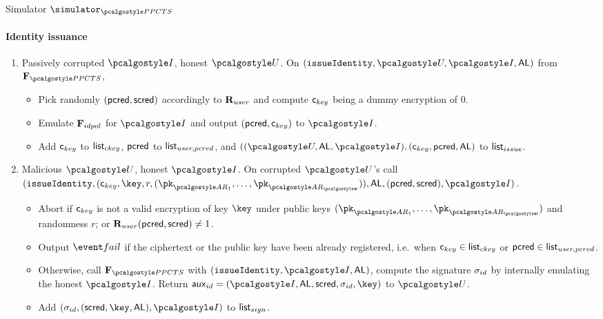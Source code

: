 \documentclass[runningheads,10pt]{llncs}
\numberwithin{equation}{section}
\begin{document}
\begin{simbox}{Simulator $\simulator_{\PPCTS}$}
  \paragraph{Identity issuance}
  \begin{enumerate}
  \item Passively corrupted $\idprov$, honest $\user$. On $(\issueIdentity, \user, \idprov, \AL)$ from $\func{\PPCTS}$,
    \begin{itemize}
    \item Pick
      randomly $(\mathsf{pcred}, \mathsf{scred})$ accordingly to $\mathbf{R}_{user}$ and compute $\mathsf{c}_{key}$ being a
      dummy encryption of $0$.
  \item Emulate $\mathbf{F}_{{idpol}}$ for $\idprov$ and output $(\mathsf{pcred}, \mathsf{c}_{key})$
    to $\idprov$. 
  \item Add $\mathsf{c}_{key}$ to ${\mathsf{list}_{ckey}}$, $\mathsf{pcred}$ to ${\mathsf{list}_{user, pcred}}$, and
    $((\user, \AL, \idprov), (\ckey, \pcred, \AL)$ to ${\mathsf{list}_{issue}}$.
  \end{itemize}
\item Malicious $\user$, honest $\idprov$. On corrupted $\user$'s call $(\issueIdentity, (\ckey, \key, r,
      (\pk_{\ar_1}, \ldots, \pk_{\ar_\noofar})), \AL, (\pcred, \scred),
      \idprov)$.
  \begin{itemize}
    \item Abort if $\mathsf{c}_{key}$ is not a valid encryption of
      key $\key$ under public keys $(\pk_{\ar_1}, \ldots, \pk_{\ar_\noofar})$
      and randomness $r$; or $\mathbf{R}_{user}(\mathsf{pcred}, \mathsf{scred}) \neq 1$.
    \item  Output $\fail$ if the ciphertext or the public key
      have been already registered, i.e.~when $\mathsf{c}_{key} \in {\mathsf{list}_{ckey}}$ or
      $\mathsf{pcred} \in {\mathsf{list}_{user, pcred}}$. 
  \item Otherwise, call $\func{\PPCTS}$ with $(\issueIdentity, \idprov, \AL)$,
    compute the signature $\sigma_{id}$ by internally emulating the honest
    $\idprov$. Return $\aux_{id} = (\idprov, \AL, \scred, \signature_{id}, \key)$
    to $\user$.
    \item Add $(\signature_{id}, (\scred, \key, \AL),
      \idprov)$ to ${\mathsf{list}_{sign}}$.
    \end{itemize}
  \end{enumerate}


\end{simbox}
\end{document}
